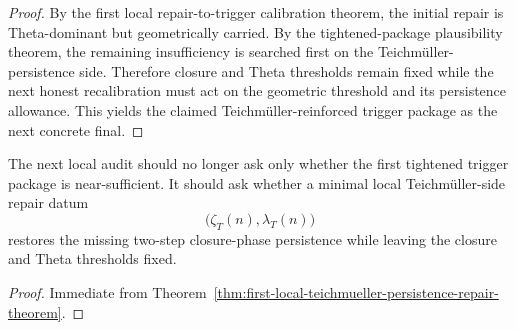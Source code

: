 \begin{proof}
By the first local repair-to-trigger calibration theorem, the initial repair is Theta-dominant but geometrically carried. By the tightened-package plausibility theorem, the remaining insufficiency is searched first on the Teichm\"uller-persistence side. Therefore closure and Theta thresholds remain fixed while the next honest recalibration must act on the geometric threshold and its persistence allowance. This yields the claimed Teichm\"uller-reinforced trigger package as the next concrete final.
\end{proof}

\begin{corollary}\label{cor:current-post-r23-working-rule}
The next local audit should no longer ask only whether the first tightened trigger package is near-sufficient. It should ask whether a minimal local Teichm\"uller-side repair datum
\[
\bigl(\zeta_T(n),\lambda_T(n)\bigr)
\]
restores the missing two-step closure-phase persistence while leaving the closure and Theta thresholds fixed.
\end{corollary}

\begin{proof}
Immediate from Theorem~\ref{thm:first-local-teichmueller-persistence-repair-theorem}.
\end{proof}

